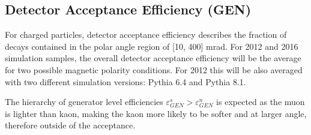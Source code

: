 

\subsection{Detector Acceptance Efficiency (GEN)}
For charged particles, detector acceptance efficiency describes the fraction of decays contained in the polar angle region of [10, 400] mrad.  
For 2012 and 2016 simulation samples, the overall detector acceptance efficiency will be the average for two possible magnetic polarity conditions. For 2012 this will be also averaged with two different simulation versions: Pythia 6.4\cite{pythia6} and Pythia 8.1\cite{pythia8}.

The hierarchy of generator level efficiencies $\varepsilon^{s}_{GEN} > \varepsilon^{n}_{GEN}$ is expected as the muon is lighter than kaon, making the kaon more likely to be softer and at larger angle, therefore outside of the acceptance. 

